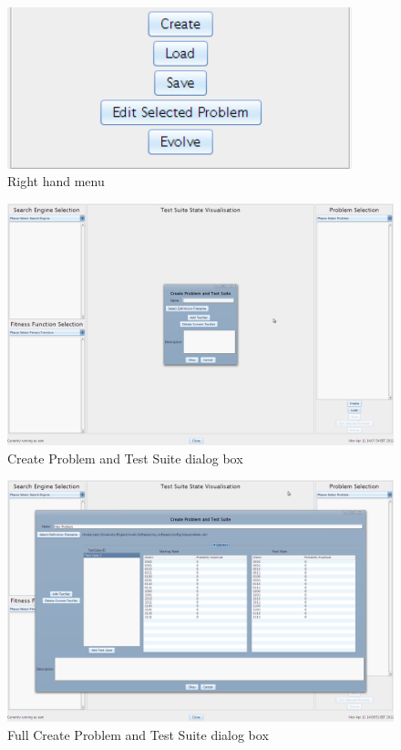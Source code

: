 \begin{figure}
\begin{center}
  \includegraphics[width=10cm]{walkthrough2.png}
\end{center}
 \caption{Right hand menu}
 \label{fig:walkthrough2}
\end{figure}

\begin{figure}
  \includegraphics[width=\textwidth]{walkthrough3.png}
 \caption{Create Problem and Test Suite dialog box}
 \label{fig:walkthrough3}
\end{figure}

\begin{figure}
  \includegraphics[width=\textwidth]{walkthrough4.png}
 \caption{Full Create Problem and Test Suite dialog box}
 \label{fig:walkthrough4}
\end{figure}

